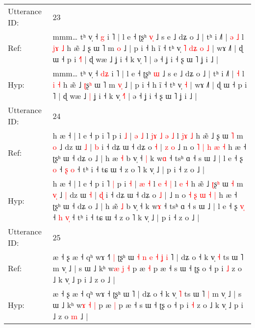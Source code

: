 \documentclass[10pt]{article}
\DeclareRobustCommand{\hl}[1]{{\textcolor{red}{#1}}}
\begin{document}
\begin{longtable}{ll}
 \\
\midrule
Utterance ID: & 23 \\
Ref: & mmm… tʰ v̩ ˧ \hl{}\hl{g} i ˥ | l e ˧ ʈʂʰ \hl{v}\hl{̩} ˩ s e ˩ dʑ o ˩ | tʰ i ˩˥ |\hl{ }\hl{ə} \hl{˩} l \hl{j}\hl{ɤ} \hl{˩} h æ̃ ˩ \hl{}ʂ\hl{} ɯ ˥ m \hl{}\hl{o} ˩ | p i ˧ h ĩ ˧ tʰ v̩\hl{ }\hl{˥}\hl{ }\hl{d}\hl{ʑ}\hl{ }\hl{o} \hl{˩} | wɤ ˩˥ | ɖ ɯ ˧ p i \hl{˧}˥ | ɖ wæ ˩\hl{}\hl{} ʝ i ˧ k v̩ \hl{}˥ | ə ˧ ʝ i ˧ ʂ ɯ ˥ ʝ i ˩ |
 \\
Hyp: & mmm… tʰ v̩ ˧ \hl{d}\hl{ʑ} i ˥ | l e ˧ ʈʂʰ \hl{}\hl{ɯ} ˩ s e ˩ dʑ o ˩ | tʰ i ˩˥ |\hl{}\hl{} \hl{˧} l \hl{}\hl{i} \hl{˧} h æ̃ ˩ \hl{ʈ}ʂ\hl{ʰ} ɯ ˥ m \hl{v}\hl{̩} ˩ | p i ˧ h ĩ ˧ tʰ v̩\hl{}\hl{}\hl{}\hl{}\hl{}\hl{}\hl{} \hl{˧} | wɤ ˩˥ | ɖ ɯ ˧ p i \hl{}˥ | ɖ wæ ˩\hl{ }\hl{|} ʝ i ˧ k v̩ \hl{˧}˥ | ə ˧ ʝ i ˧ ʂ ɯ ˥ ʝ i ˩ |
 \\
\midrule
Utterance ID: & 24 \\
Ref: & h æ ˧ | l e ˧ p i ˥\hl{}\hl{} p i \hl{˩} | \hl{ə} \hl{˩} l\hl{ }\hl{j}\hl{ɤ} \hl{˩} \hl{ə} \hl{˩} l \hl{j}\hl{ɤ} \hl{˩} h æ̃ ˩ \hl{}ʂ\hl{} ɯ \hl{˥} m \hl{}\hl{o} ˩\hl{}\hl{} dz ɯ \hl{˩} | \hl{b} i ˧ dʑ ɯ ˧ dʑ o \hl{˧} |\hl{ }\hl{z}\hl{ }\hl{o} ˩ n o \hl{˥} \hl{|} \hl{h} \hl{æ} \hl{˧} h æ ˧ ʈʂʰ ɯ ˧ dʑ o ˩ | h æ\hl{} \hl{˧} b v̩ ˧\hl{ }\hl{|} k w\hl{ɑ} ˧ tsʰ ɑ ˧ s ɯ ˩ | l e ˧ ʂ \hl{}\hl{o} ˧ \hl{ʂ} \hl{}\hl{o} ˧ tʰ i ˧ tɕ ɯ ˧ z o ˥ k v̩ ˩ | p i ˧ z o ˩ |
 \\
Hyp: & h æ ˧ | l e ˧ p i ˥\hl{ }\hl{|} p i \hl{˧} | \hl{æ} \hl{˧} l\hl{}\hl{}\hl{} \hl{e} \hl{˧} \hl{|} l \hl{}\hl{e} \hl{˧} h æ̃ ˩ \hl{ʈ}ʂ\hl{ʰ} ɯ \hl{˧} m \hl{v}\hl{̩} ˩\hl{ }\hl{|} dz ɯ \hl{˧} | \hl{ɖ} i ˧ dʑ ɯ ˧ dʑ o \hl{˩} |\hl{}\hl{}\hl{}\hl{} ˩ n o \hl{˧} \hl{ʂ} \hl{ɯ} \hl{˧} \hl{|} h æ ˧ ʈʂʰ ɯ ˧ dʑ o ˩ | h æ\hl{̃} \hl{˩} b v̩ ˧\hl{}\hl{} k w\hl{ɤ} ˧ tsʰ ɑ ˧ s ɯ ˩ | l e ˧ ʂ \hl{v}\hl{̩} ˧ \hl{h} \hl{v}\hl{̩} ˧ tʰ i ˧ tɕ ɯ ˧ z o ˥ k v̩ ˩ | p i ˧ z o ˩ |
 \\
\midrule
Utterance ID: & 25 \\
Ref: & æ ˧ ʂ æ ˧ qʰ wɤ ˧\hl{˥}\hl{ }\hl{|} ʈʂʰ ɯ\hl{ }\hl{˧}\hl{ }\hl{n}\hl{ }\hl{e}\hl{ }\hl{˧}\hl{ }\hl{ʝ}\hl{ }\hl{i} ˥ | dʑ o ˧ k v̩ \hl{˧} ts ɯ ˥\hl{}\hl{} m v̩ ˩ | s ɯ ˩ kʰ w\hl{æ} \hl{j} \hl{˧} p æ \hl{˧} p æ ˧ s ɯ ˧ ʈʂ o ˧ p i \hl{˩} z o ˩ k v̩ ˩ p i ˩ z o\hl{}\hl{} ˩ |
 \\
Hyp: & æ ˧ ʂ æ ˧ qʰ wɤ ˧\hl{}\hl{}\hl{} ʈʂʰ ɯ\hl{}\hl{}\hl{}\hl{}\hl{}\hl{}\hl{}\hl{}\hl{}\hl{}\hl{}\hl{} ˥ | dʑ o ˧ k v̩ \hl{˥} ts ɯ ˥\hl{ }\hl{|} m v̩ ˩ | s ɯ ˩ kʰ w\hl{ɤ} \hl{˧} \hl{|} p æ \hl{|} p æ ˧ s ɯ ˧ ʈʂ o ˧ p i \hl{˧} z o ˩ k v̩ ˩ p i ˩ z o\hl{ }\hl{m} ˩ |

\end{longtable}
\end{document}
